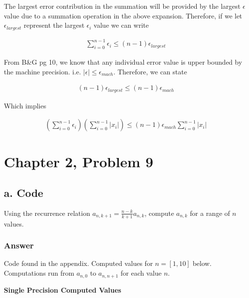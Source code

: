 \documentclass{article}
\newcommand{\n}{\newline}
\begin{document}
	The largest error contribution in the summation will be provided by the largest $\epsilon$ value due to a summation operation in the above expansion.  Therefore, if we let $\epsilon_{largest}$ represent the largest $\epsilon_{i}$ value we can write
	
	\begin{equation}
		\begin{split}
		\sum^{n-1}_{i=0}\epsilon_{i}\leq(n-1)\epsilon_{largest}
		\end{split}
	\end{equation}
	
	From B\&G pg 10, we know that any individual error value is upper bounded by the machine precision.  i.e. $|\epsilon|\leq\epsilon_{mach}$.  Therefore, we can state
	
	\begin{equation}
		\begin{split}
		(n-1)\epsilon_{largest}\leq(n-1)\epsilon_{mach}
		\end{split}
	\end{equation}
	
	Which implies
	
	\begin{equation}
		\begin{split}
		(\sum^{n-1}_{i=0}\epsilon_{i})(\sum^{n-1}_{i=0}|x_{i}|)\leq(n-1)\epsilon_{mach}\sum^{n-1}_{i=0}|x_{i}|
		\end{split}
	\end{equation}
	
	\section{Chapter 2, Problem 9}
	\subsection{a. Code}
	Using the recurrence relation $a_{n,k+1}=\frac{n-k}{k+1}a_{n,k}$, compute $a_{n,k}$ for a range of $n$ values.
	
	\subsubsection{Answer}
	
	Code found in the appendix.  Computed values for $n=[1,10]$ below.  Computations run from $a_{n,0}$ to $a_{n,n+1}$ for each value $n$.\n
	\begin{center}
		\newpage
		\textbf{Single Precision Computed Values\n}
	\end{center}
	
\end{document}
